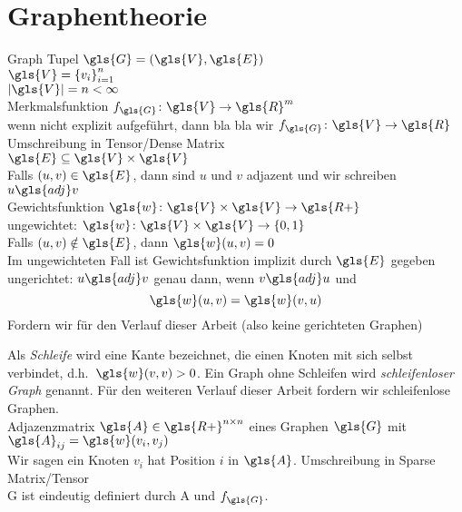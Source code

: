 \section{Graphentheorie}

Graph Tupel $\gls{G} = \left(\gls{V}, \gls{E}\right)$\\
$\gls{V} = {\left\{ v_i \right\}}^n_{i=1}$\\
$\left| \gls{V} \right| = n < \infty$\\
Merkmalsfunktion $f_{\gls{G}} \colon \gls{V} \to \gls{R}^m$\\
wenn nicht explizit aufgeführt, dann bla bla wir $f_{\gls{G}} \colon \gls{V} \to \gls{R}$\\
Umschreibung in Tensor/Dense Matrix\\
$\gls{E} \subseteq \gls{V} \times \gls{V}$\\
Falls $\left( u, v \right) \in \gls{E}$, dann sind $u$ und $v$ adjazent und wir schreiben $u \gls{adj} v$\\
Gewichtsfunktion $\gls{w} \colon \gls{V} \times \gls{V} \to \gls{R+}$\\
ungewichtet: $\gls{w} \colon \gls{V} \times \gls{V} \to \left\{ 0, 1 \right\}$\\
Falls $\left( u, v \right) \notin \gls{E}$, dann $\gls{w}\left(u, v\right) = 0$\\
Im ungewichteten Fall ist Gewichtsfunktion implizit durch $\gls{E}$ gegeben\\

ungerichtet:
$u \gls{adj} v$ genau dann, wenn $v \gls{adj} u$ und
\begin{equation}
  \gls{w}\left(u, v\right) = \gls{w}\left(v, u\right)
\end{equation}
Fordern wir für den Verlauf dieser Arbeit (also keine gerichteten Graphen)

Als \emph{Schleife} wird eine Kante bezeichnet, die einen Knoten mit sich selbst verbindet, d.h.\ $\gls{w}\left(v, v\right) > 0$.
Ein Graph ohne Schleifen wird \emph{schleifenloser Graph} genannt.
Für den weiteren Verlauf dieser Arbeit fordern wir schleifenlose Graphen.\\

Adjazenzmatrix $\gls{A} \in \gls{R+}^{n \times n}$ eines Graphen $\gls{G}$ mit $\gls{A}_{ij} = \gls{w}\left(v_i, v_j\right)$\\
Wir sagen ein Knoten $v_i$ hat Position $i$ in $\gls{A}$.
Umschreibung in Sparse Matrix/Tensor\\

\gls{G} ist eindeutig definiert durch \gls{A} und $f_{\gls{G}}$.

